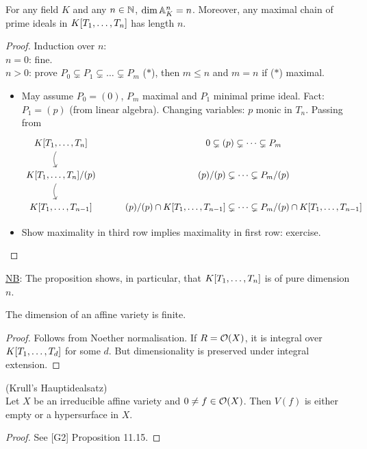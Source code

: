 \documentclass[a4paper,11pt]{article}
\begin{document}
			\begin{prop}
				For any field $K$ and any $n\in\N$, $\dim\AA^n_K=n$. Moreover, any maximal chain of prime ideals in $\K$ has length $n$.
			\end{prop}
			\begin{proof}
				Induction over $n$:\\
				$n=0$: fine.\\
				$n>0$: prove $P_0\subsetneq P_1\subsetneq\dots\subsetneq P_m$ ($\ast$), then $m\le n$ and $m=n$ if ($\ast$) maximal.
				\begin{itemize}
					\item May assume $P_0=(0)$, $P_m$ maximal and $P_1$ minimal prime ideal. Fact: $P_1=(p)$ (from linear algebra). Changing variables: $p$ monic in $T_n$. Passing from
					\begin{equation*}
						\begin{tikzcd}
							\K\ar[d, bend right] & 0\subsetneq(p)\subsetneq\dots\subsetneq P_m\\
							\K/(p)\ar[d,bend right] & (p)/(p)\subsetneq\dots\subsetneq P_m/(p)\\
							\K[n-1] & (p)/(p)\cap\K[n-1]\subsetneq\dots\subsetneq P_m/(p)\cap\K[n-1]
						\end{tikzcd}
					\end{equation*}
					\item Show maximality in third row implies maximality in first row: exercise. 
				\end{itemize} 
			\end{proof}

			\noindent\underline{NB}: The proposition shows, in particular, that $\K$ is of pure dimension $n$.

			\begin{cor}
				The dimension of an affine variety is finite.
			\end{cor}
			\begin{proof}
				Follows from Noether normalisation. If $R=\O(X)$, it is integral over $\K[d]$ for some $d$. But dimensionality is preserved under integral extension.
			\end{proof}

			\begin{thm}\label{thm-krull}
				(Krull's Hauptidealsatz)\\ Let $X$ be an irreducible affine variety and $0\neq f\in\O(X)$. Then $V(f)$ is either empty or a hypersurface in $X$.
			\end{thm}
			\begin{proof}\renewcommand{\qedsymbol}{}
				See [G2] Proposition 11.15.
			\end{proof}\renewcommand{\qedsymbol}{$\square$}
\end{document}
